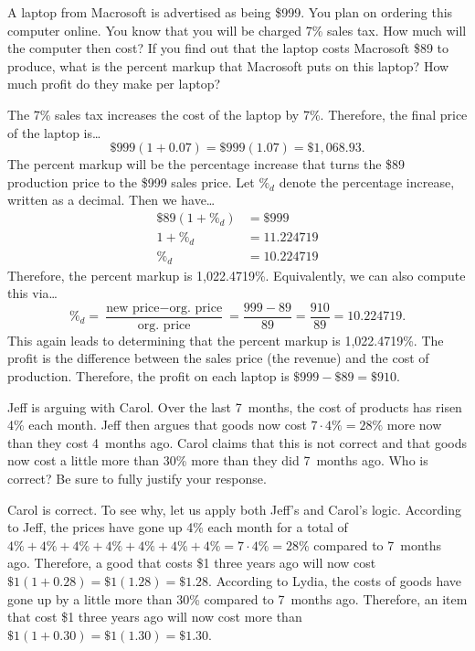 \documentclass[11pt,letterpaper]{article}
\begin{document}
	

\newpage



 A laptop from Macrosoft is advertised as being \$999. You plan on ordering this computer online. You know that you will be charged 7\% sales tax. How much will the computer then cost? If you find out that the laptop costs Macrosoft \$89 to produce, what is the percent markup that Macrosoft puts on this laptop? How much profit do they make per laptop? \pspace

\sol The 7\% sales tax increases the cost of the laptop by 7\%. Therefore, the final price of the laptop is\dots 
	\[
	\$999(1 + 0.07)= \$999(1.07)= \$1,068.93.
	\] 
The percent markup will be the percentage increase that turns the \$89 production price to the \$999 sales price. Let $\%_d$ denote the percentage increase, written as a decimal. Then we have\dots \pspace
	\[
	\begin{aligned}
	\$89(1 + \%_d)&= \$999 \\[0.3cm]
	1 + \%_d&= 11.224719 \\[0.3cm]
	\%_d&= 10.224719
	\end{aligned}
	\] \pspace
Therefore, the percent markup is 1,022.4719\%. Equivalently, we can also compute this via\dots \pspace
	\[
	\%_d= \dfrac{\text{new price} - \text{org. price}}{\text{org. price}}= \dfrac{999 - 89}{89}= \dfrac{910}{89}= 10.224719.
	\] \pspace
This again leads to determining that the percent markup is 1,022.4719\%. The profit is the difference between the sales price (the revenue) and the cost of production. Therefore, the profit on each laptop is $\$999 - \$89= \$910$. 



\newpage



 Jeff is arguing with Carol. Over the last 7~months, the cost of products has risen 4\% each month. Jeff then argues that goods now cost $7 \cdot 4\%= 28\%$ more now than they cost 4~months ago. Carol claims that this is not correct and that goods now cost a little more than 30\% more than they did 7~months ago. Who is correct? Be sure to fully justify your response. \pspace

\sol Carol is correct. To see why, let us apply both Jeff's and Carol's logic. According to Jeff, the prices have gone up 4\% each month for a total of $4\% + 4\% + 4\% + 4\% + 4\% + 4\% + 4\%= 7 \cdot 4\%= 28\%$ compared to 7~months ago. Therefore, a good that costs \$1 three years ago will now cost $\$1(1 + 0.28)= \$1(1.28)= \$1.28$. According to Lydia, the costs of goods have gone up by a little more than 30\% compared to 7~months ago. Therefore, an item that cost \$1 three years ago will now cost more than $\$1(1 + 0.30)= \$1(1.30)= \$1.30$. \pspace
\end{document}
